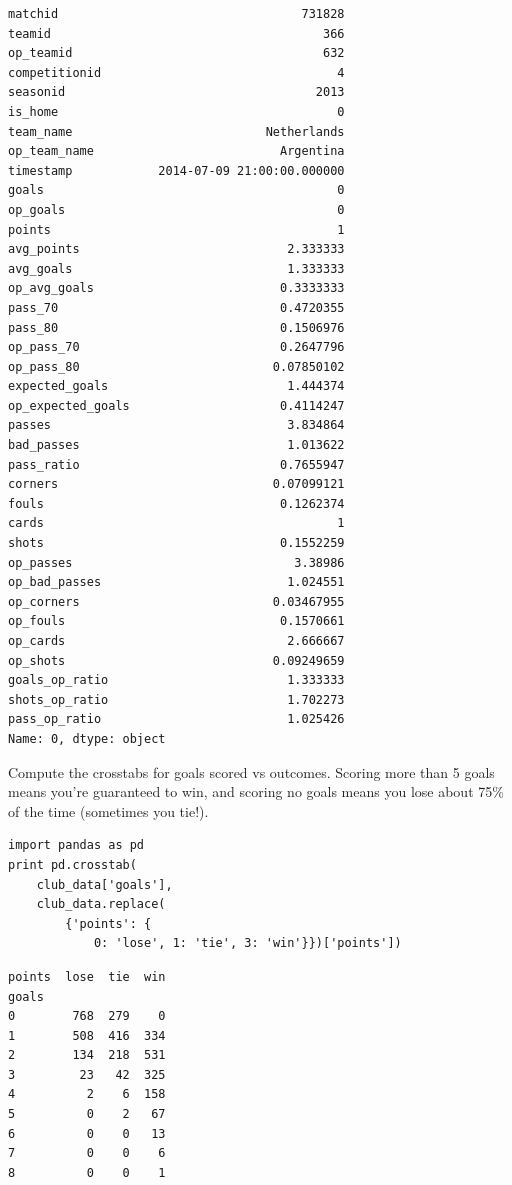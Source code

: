 \documentclass[12pt,fleqn]{article}\usepackage{../common}
\begin{document}
\begin{verbatim}
matchid                                  731828
teamid                                      366
op_teamid                                   632
competitionid                                 4
seasonid                                   2013
is_home                                       0
team_name                           Netherlands
op_team_name                          Argentina
timestamp            2014-07-09 21:00:00.000000
goals                                         0
op_goals                                      0
points                                        1
avg_points                             2.333333
avg_goals                              1.333333
op_avg_goals                          0.3333333
pass_70                               0.4720355
pass_80                               0.1506976
op_pass_70                            0.2647796
op_pass_80                           0.07850102
expected_goals                         1.444374
op_expected_goals                     0.4114247
passes                                 3.834864
bad_passes                             1.013622
pass_ratio                            0.7655947
corners                              0.07099121
fouls                                 0.1262374
cards                                         1
shots                                 0.1552259
op_passes                               3.38986
op_bad_passes                          1.024551
op_corners                           0.03467955
op_fouls                              0.1570661
op_cards                               2.666667
op_shots                             0.09249659
goals_op_ratio                         1.333333
shots_op_ratio                         1.702273
pass_op_ratio                          1.025426
Name: 0, dtype: object
\end{verbatim}

Compute the crosstabs for goals scored vs outcomes. Scoring more than 5
goals means you're guaranteed to win, and scoring no goals means you lose
about 75\% of the time (sometimes you tie!).

\begin{verbatim}
import pandas as pd
print pd.crosstab(
    club_data['goals'], 
    club_data.replace(
        {'points': {
            0: 'lose', 1: 'tie', 3: 'win'}})['points'])
\end{verbatim}

\begin{verbatim}
points  lose  tie  win
goals                 
0        768  279    0
1        508  416  334
2        134  218  531
3         23   42  325
4          2    6  158
5          0    2   67
6          0    0   13
7          0    0    6
8          0    0    1
\end{verbatim}
\end{document}
